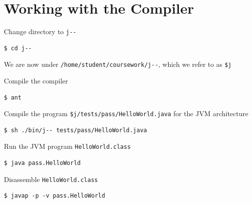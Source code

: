 \documentclass[8pt,a4paper,compress]{beamer}
\begin{document}
\section{Working with the \protect \jmm Compiler}
\begin{frame}[fragile]
\pause\transdissolve

Change directory to \lstinline{j--}

\begin{tcolorbox}[enhanced,drop shadow southwest,sharp corners,size=fbox,colback=black]
\begin{lstlisting}[style=terminal]
$ cd j--
\end{lstlisting}
\end{tcolorbox}

\pause\transdissolve\bigskip

We are now under \lstinline{/home/student/coursework/j--}, which we refer to as \lstinline{$j}

\pause\transdissolve\bigskip

Compile the \jmm compiler

\begin{tcolorbox}[enhanced,drop shadow southwest,sharp corners,size=fbox,colback=black]
\begin{lstlisting}[style=terminal]
$ ant
\end{lstlisting}
\end{tcolorbox}

\pause\transdissolve\bigskip

Compile the \jmm program \lstinline{$j/tests/pass/HelloWorld.java} for the JVM architecture

\begin{tcolorbox}[enhanced,drop shadow southwest,sharp corners,size=fbox,colback=black]
\begin{lstlisting}[style=terminal]
$ sh ./bin/j-- tests/pass/HelloWorld.java
\end{lstlisting}
\end{tcolorbox}

\pause\transdissolve\bigskip

Run the JVM program \lstinline{HelloWorld.class}

\begin{tcolorbox}[enhanced,drop shadow southwest,sharp corners,size=fbox,colback=black]
\begin{lstlisting}[style=terminal]
$ java pass.HelloWorld
\end{lstlisting}
\end{tcolorbox}

\pause\transdissolve\bigskip

Disassemble \lstinline{HelloWorld.class}

\begin{tcolorbox}[enhanced,drop shadow southwest,sharp corners,size=fbox,colback=black]
\begin{lstlisting}[style=terminal]
$ javap -p -v pass.HelloWorld
\end{lstlisting}
\end{tcolorbox}
\end{frame}
\end{document}
